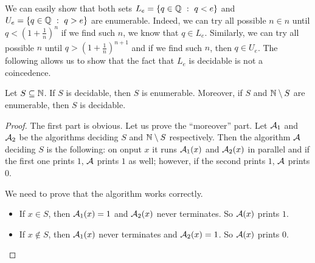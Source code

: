 We can easily show that both sets $L_e = \set[q < e]{q \in \Q}$ and
$U_e = \set[q > e]{q \in \Q}$ are enumerable. Indeed, we can try all possible
$n \in n$ until $q < (1 + \frac{1}{n})^n$ if we find such $n$, we know that
$q \in L_e$. Similarly, we can try all possible $n$ until
$q > (1 + \frac{1}{n})^{n + 1}$ and if we find such $n$, then $q \in U_e$.
The following allows us to show that the fact that $L_e$ is decidable is not
a coincedence.
\begin{theorem}
\label{theorem:enumerable-to-decidable}
  Let $S \subseteq {\mathbb{N}}$. If $S$ is decidable, then $S$ is enumerable.
  Moreover, if $S$ and ${\mathbb{N}} \setminus S$ are enumerable, then $S$ is
  decidable.
\end{theorem}
\begin{proof}
  The first part is obvious. Let us prove the ``moreover'' part.
  Let $\mathcal{A}_1$ and $\mathcal{A}_2$ be the algorithms deciding
  $S$ and ${\mathbb{N}} \setminus S$ respectively. Then the algorithm $\mathcal{A}$
  deciding $S$ is the following: on onput $x$ it runs $\mathcal{A}_1(x)$ and
  $\mathcal{A}_2(x)$ in parallel and if the first one prints $1$,
  $\mathcal{A}$ prints $1$ as well;
  however, if the second prints $1$, $\mathcal{A}$ prints $0$.

  We need to prove that the algorithm works correctly.
  \begin{itemize}
    \item If $x \in S$, then $\mathcal{A}_1(x) = 1$ and $\mathcal{A}_2(x)$
      never terminates. So $\mathcal{A}(x)$ prints $1$.
    \item If $x \notin S$, then $\mathcal{A}_1(x)$ never terminates and
      $\mathcal{A}_2(x) = 1$. So $\mathcal{A}(x)$ prints $0$.
  \end{itemize}
\end{proof}

